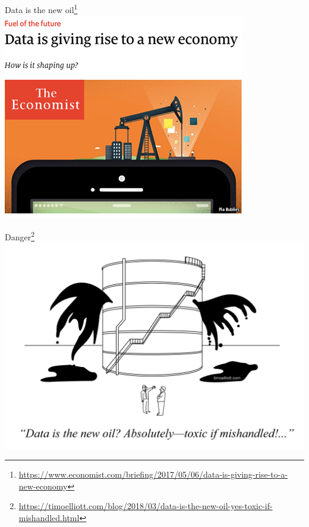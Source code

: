 \documentclass{beamer}\usepackage[]{graphicx}\usepackage[]{color}
\begin{document}
\begin{frame}{Data is the new oil\footnote{\scriptsize\url{https://www.economist.com/briefing/2017/05/06/data-is-giving-rise-to-a-new-economy}}}
	\centering
	\includegraphics[scale=0.5]{figure/oil.jpg}

\end{frame}



\begin{frame}{Danger\footnote{\scriptsize\url{https://timoelliott.com/blog/2018/03/data-is-the-new-oil-yes-toxic-if-mishandled.html}}}
	\centering
	\includegraphics[scale=0.15]{figure/toxic.jpg}	
\end{frame}
\end{document}

